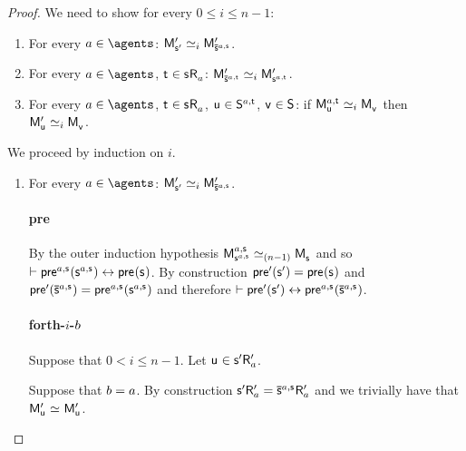 \begin{proof}
We need to show for every $0 \leq i \leq n - 1$: 
\begin{enumerate}
    \item For every $\agentA \in \agents$: $\aPModelP{\aStateSP} \bisimilar[i] \aPModelP{\aPStateS[\agentA,\aStateS]}$.
    \item For every $\agentA \in \agents$, $\aStateT \in \aStateS \aAccessibility{\agentA}$: $\aPModelP{\aPStateS[\agentA,\aStateT]} \bisimilar[i] \aPModelP{\aStateS[\agentA,\aStateT]}$.
    \item For every $\agentA \in \agents$, $\aStateT \in \aStateS \aAccessibility{\agentA}$, $\aStateU \in \aStates[\agentA,\aStateT]$, $\aStateV \in \aStates$: if $\aPModel[\agentA,\aStateT]{\aStateU} \bisimilar[i] \aPModel{\aStateV}$ then $\aPModelP{\aStateU} \bisimilar[i] \aPModel{\aStateV}$.
\end{enumerate}

We proceed by induction on $i$.

\begin{enumerate}
    \item 
        For every $\agentA \in \agents$: $\aPModelP{\aStateSP} \bisimilar[i] \aPModelP{\aPStateS[\agentA,\aStateS]}$.

        \paragraph{pre}

        By the outer induction hypothesis $\aPModel[\agentA,\aStateS]{\aStateS[\agentA,\aStateS]} \bisimilar[(n - 1)] \aPModel{\aStateS}$ and so $\proves \aPrecondition[\agentA,\aStateS](\aStateS[\agentA,\aStateS]) \iff \aPrecondition(\aStateS)$.
        By construction $\aPreconditionP(\aStateSP) = \aPrecondition(\aStateS)$ and $\aPreconditionP(\aPStateS[\agentA,\aStateS]) = \aPrecondition[\agentA,\aStateS](\aStateS[\agentA,\aStateS])$ and therefore $\proves \aPreconditionP(\aStateSP) \iff \aPrecondition[\agentA,\aStateS](\aPStateS[\agentA,\aStateS])$.

        \paragraph{forth-$i$-$b$} Suppose that $0 < i \leq n - 1$. Let $\aStateU \in \aStateSP \aAccessibilityP{\agentA}$. 

        Suppose that $b = a$.
        By construction $\aStateSP \aAccessibilityP{\agentA} = \aPStateS[\agentA,\aStateS] \aAccessibilityP{\agentA}$ and we trivially have that $\aPModelP{\aStateU} \bisimilar \aPModelP{\aStateU}$.


\end{enumerate}
\end{proof}
